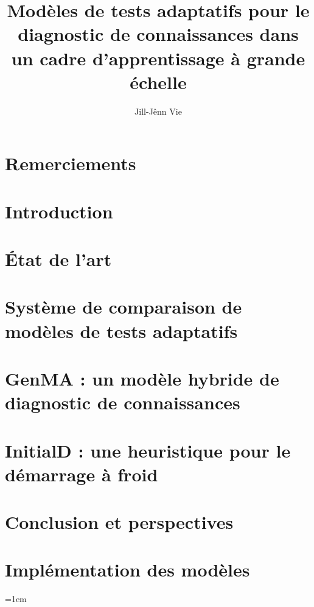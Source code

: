 \documentclass[12pt,a4paper]{book}
\title{Modèles de tests adaptatifs pour le diagnostic de connaissances dans un cadre d'apprentissage à grande échelle}
\author{Jill-Jênn Vie}
\begin{document}

\restoregeometry

\chapter*{Remerciements}


\printglossaries
\printnomenclature

\clearpage
\tableofcontents

\chapter{Introduction}


\chapter{État de l'art}


\chapter{Système de comparaison de modèles de tests adaptatifs}



\chapter{GenMA : un modèle hybride de diagnostic de connaissances}




\chapter{InitialD : une heuristique pour le démarrage à froid}



\chapter{Conclusion et perspectives}


%

\clearpage
\listoffigures
\listoftables

\appendix

\chapter{Implémentation des modèles}


\emergencystretch=1em
\printbibliography

\null\newpage
\thispagestyle{empty}


\null\newpage
\thispagestyle{empty}

\end{document}
